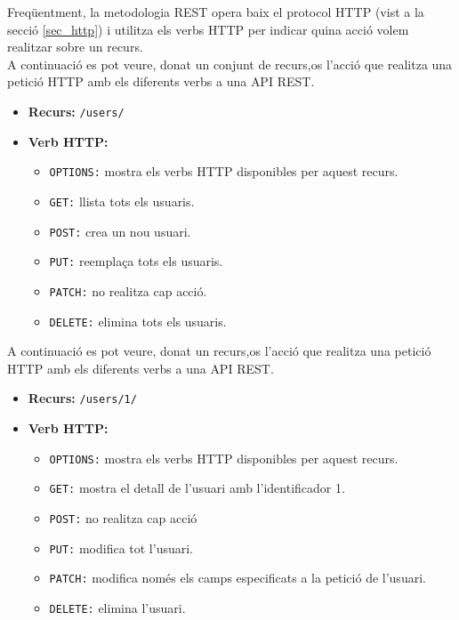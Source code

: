 Freqüentment, la metodologia \ac{REST} opera baix el protocol \ac{HTTP} (vist a la secció \ref{sec_http}) i utilitza els verbs \ac{HTTP} per indicar quina acció volem realitzar sobre un recurs.\\

A continuació es pot veure, donat un conjunt de recurs,os l'acció que realitza una petició \ac{HTTP} amb els diferents verbs a una \ac{API} \ac{REST}.

\begin{itemize}
	\item \textbf{Recurs:} \texttt{/users/}
	\item \textbf{Verb \ac{HTTP}:}
		\begin{itemize}
			\item \texttt{OPTIONS:} mostra els verbs \ac{HTTP} disponibles per aquest recurs.
			\item \texttt{GET:} llista tots els usuaris. 
			\item \texttt{POST:} crea un nou usuari.
			\item \texttt{PUT:} reemplaça tots els usuaris.
			\item \texttt{PATCH:} no realitza cap acció.
			\item \texttt{DELETE:} elimina tots els usuaris.
		\end{itemize}
\end{itemize}
	
A continuació es pot veure, donat un recurs,os l'acció que realitza una petició \ac{HTTP} amb els diferents verbs a una \ac{API} \ac{REST}.

\begin{itemize}
	\item \textbf{Recurs:} \texttt{/users/1/}
	\item \textbf{Verb \ac{HTTP}:}
		\begin{itemize}
			\item \texttt{OPTIONS:} mostra els verbs \ac{HTTP} disponibles per aquest recurs.
			\item \texttt{GET:} mostra el detall de l'usuari amb l'identificador 1.
			\item \texttt{POST:} no realitza cap acció
			\item \texttt{PUT:} modifica tot l'usuari.
			\item \texttt{PATCH:} modifica només els camps especificats a la petició de l'usuari.
			\item \texttt{DELETE:} elimina l'usuari.
		\end{itemize}
\end{itemize}

